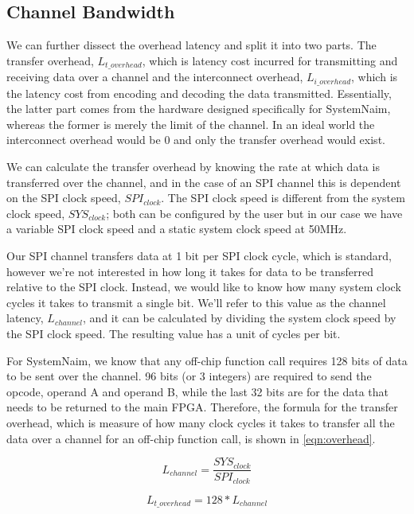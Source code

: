 \subsection{Channel Bandwidth}
 
We can further dissect the overhead latency and split it into two parts. The transfer overhead, $L_{t\_overhead}$, which is latency cost incurred for transmitting and receiving data over a channel and the interconnect overhead, $L_{i\_overhead}$, which is the latency cost from encoding and decoding the data transmitted. Essentially, the latter part comes from the hardware designed specifically for SystemNaim, whereas the former is merely the limit of the channel. In an ideal world the interconnect overhead would be 0 and only the transfer overhead would exist. 

We can calculate the transfer overhead by knowing the rate at which data is transferred over the channel, and in the case of an SPI channel this is dependent on the SPI clock speed, $\mathit{SPI}_{clock}$. The SPI clock speed is different from the system clock speed, $\mathit{SYS}_{clock}$; both can be configured by the user but in our case we have a variable SPI clock speed and a static system clock speed at 50MHz.

Our SPI channel transfers data at 1 bit per SPI clock cycle, which is standard, however we're not interested in how long it takes for data to be transferred relative to the SPI clock. Instead, we would like to know how many system clock cycles it takes to transmit a single bit. We'll refer to this value as the channel latency, $L_{channel}$, and it can be calculated by dividing the system clock speed by the SPI clock speed. The resulting value has a unit of cycles per bit.

For SystemNaim, we know that any off-chip function call requires 128 bits of data to be sent over the channel. 96 bits (or 3 integers) are required to send the opcode, operand A and operand B, while the last 32 bits are for the data that needs to be returned to the main FPGA. Therefore, the formula for the transfer overhead, which is measure of how many clock cycles it takes to transfer all the data over a channel for an off-chip function call, is shown in \autoref{eqn:overhead}. 

\begin{equation}
    L_{channel} = \frac{\mathit{SYS}_{clock}}{\mathit{SPI}_{clock}} 
    \label{eqn:clock_speed}
\end{equation}

\begin{equation}
    L_{t\_overhead} = 128 * L_{channel}
    \label{eqn:overhead}
\end{equation}

